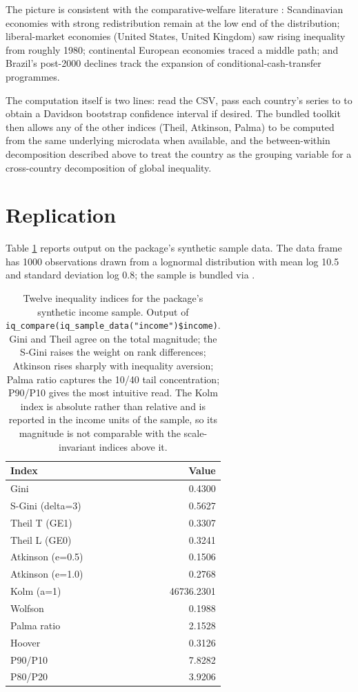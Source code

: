 The picture is consistent with the comparative-welfare literature
\citep{atkinson2008changing, piketty2014capital}: Scandinavian
economies with strong redistribution remain at the low end of the
distribution; liberal-market economies (United States, United
Kingdom) saw rising inequality from roughly 1980; continental
European economies traced a middle path; and Brazil's post-2000
declines track the expansion of conditional-cash-transfer
programmes.

The computation itself is two lines: read the CSV, pass each
country's series to  to obtain a Davidson bootstrap
confidence interval if desired. The bundled 
toolkit then allows any of the other indices (Theil, Atkinson,
Palma) to be computed from the same underlying microdata when
available, and the between-within decomposition described above to
treat the country as the grouping variable for a cross-country
decomposition of global inequality.

\section{Replication}\label{replication}

Table \ref{tab:compare} reports  output on the
package's synthetic sample data. The data frame has 1000 observations
drawn from a lognormal distribution with mean log 10.5 and standard
deviation log 0.8; the sample is bundled via
.

\begin{table}[H]
\centering
\caption{\label{tab:compare}Twelve inequality indices for the package's synthetic income sample. Output of \texttt{iq\_compare(iq\_sample\_data("income")\$income)}. Gini and Theil agree on the total magnitude; the S-Gini raises the weight on rank differences; Atkinson rises sharply with inequality aversion; Palma ratio captures the 10/40 tail concentration; P90/P10 gives the most intuitive read. The Kolm index is absolute rather than relative and is reported in the income units of the sample, so its magnitude is not comparable with the scale-invariant indices above it.}
\centering
\begin{tabular}[t]{lr}
\toprule
Index & Value\\
\midrule
Gini & 0.4300\\
S-Gini (delta=3) & 0.5627\\
Theil T (GE1) & 0.3307\\
Theil L (GE0) & 0.3241\\
Atkinson (e=0.5) & 0.1506\\
\addlinespace
Atkinson (e=1.0) & 0.2768\\
Kolm (a=1) & 46736.2301\\
Wolfson & 0.1988\\
Palma ratio & 2.1528\\
Hoover & 0.3126\\
\addlinespace
P90/P10 & 7.8282\\
P80/P20 & 3.9206\\
\bottomrule
\end{tabular}
\end{table}

